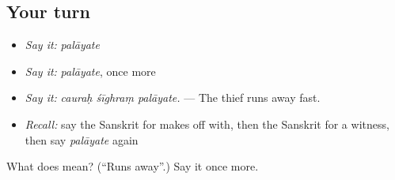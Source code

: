\subsection*{Your turn}
\begin{itemize}
\raggedright
  \item \emph{Say it:} \emph{palāyate}
  \item \emph{Say it:} \emph{palāyate}, once more
  \item \emph{Say it:} \emph{cauraḥ śīghraṃ palāyate.} — The thief runs away fast.
  \item \emph{Recall:} say the Sanskrit for makes off with, then the Sanskrit for a witness, then say \emph{palāyate} again
\end{itemize}

\begin{tcolorbox}[breakable,colback=teal!4,colframe=teal!35!black,title={Before you move on}]
What does  mean? (\textquotedblleft{}Runs away\textquotedblright{}.) Say it once more.
\end{tcolorbox}
